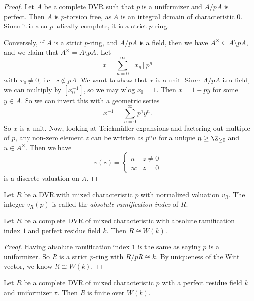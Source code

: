 \documentclass[a4paper]{article}
\begin{document}
\begin{proof}
  Let $A$ be a complete DVR such that $p$ is a uniformizer and $A/pA$ is perfect. Then $A$ is $p$-torsion free, as $A$ is an integral domain of characteristic $0$. Since it is also $p$-adically complete, it is a strict $p$-ring.

  Conversely, if $A$ is a strict $p$-ring, and $A/pA$ is a field, then we have $A^\times \subseteq A \setminus pA$, and we claim that $A^\times = A \setminus pA$. Let
  \[
    x = \sum_{n = 0}^\infty [x_n] p^n
  \]
  with $x_0 \not= 0$, i.e.\ $x \not\in pA$. We want to show that $x$ is a unit. Since $A/pA$ is a field, we can multiply by $[x_0^{-1}]$, so we may wlog $x_0 = 1$. Then $x = 1 - py$ for some $y \in A$. So we can invert this with a geometric series
  \[
    x^{-1} = \sum_{n = 0}^\infty p^n y^n.
  \]
  So $x$ is a unit. Now, looking at Teichm\"uller expansions and factoring out multiple of $p$, any non-zero element $z$ can be written as $p^n u$ for a unique $n \geq \Z_{\geq 0}$ and $u \in A^\times$. Then we have
  \[
    v(z) =
    \begin{cases}
      n & z \not= 0\\
      \infty & z = 0
    \end{cases}
  \]
  is a discrete valuation on $A$.
\end{proof}

\begin{defi}
  Let $R$ be a DVR with mixed characteristic $p$ with normalized valuation $v_R$. The integer $v_R(p)$ is called the \emph{absolute ramification index} of $R$.
\end{defi}

\begin{cor}
  Let $R$ be a complete DVR of mixed characteristic with absolute ramification index $1$ and perfect residue field $k$. Then $R \cong W(k)$.
\end{cor}

\begin{proof}
  Having absolute ramification index $1$ is the same as saying $p$ is a uniformizer. So $R$ is a strict $p$-ring with $R/pR \cong k$. By uniqueness of the Witt vector, we know $R \cong W(k)$.
\end{proof}

\begin{thm}
  Let $R$ be a complete DVR of mixed characteristic $p$ with a perfect residue field $k$ and uniformizer $\pi$. Then $R$ is finite over $W(k)$.
\end{thm}
\end{document}
